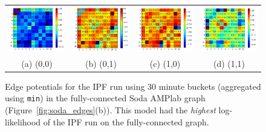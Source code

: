 \begin{figure}[ht]
\centering
\begin{tabular}{cccc}
\includegraphics[width=1.3in]{figs/30minmin00fullconf} & \includegraphics[width=1.3in]{figs/30minmin01fullconf} & \includegraphics[width=1.3in]{figs/30minmin10fullconf} & \includegraphics[width=1.3in]{figs/30minmin11fullconf} \\
(a) (0,0) & (b) (0,1) & (c) (1,0) & (d) (1,1) \\[6pt]
\end{tabular}
\caption{Edge potentials for the IPF run using 30 minute buckets (aggregated using \texttt{min}) in the fully-connected Soda AMPlab graph (Figure~\ref{fig:soda_edges}(b)). This model had the \emph{highest} log-likelihood of the IPF run on the fully-connected graph.}
\label{fig:30minminfull}
\end{figure}


